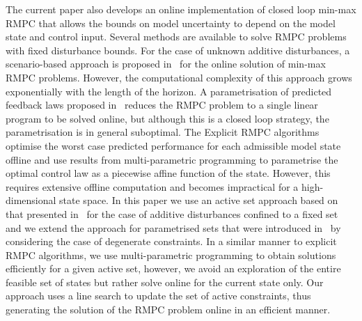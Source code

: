 \documentclass[journal]{IEEEtran}
\theoremstyle{remark}
\theoremstyle{definition}
\begin{document}
The current paper also develops an online implementation of closed loop min-max RMPC that allows the bounds on model uncertainty to depend on the model state and control input.
%
Several methods are available to solve RMPC problems with fixed disturbance bounds. For the case of unknown additive disturbances, 
a scenario-based approach is proposed in~\cite{Scokaert:1998} for the online solution of min-max RMPC problems. However, the computational complexity of this approach grows exponentially with the length of the horizon. 
%
A parametrisation of predicted feedback laws proposed in~\cite{Rakovic:2012} reduces the RMPC problem to a single linear 
program to be solved online, but although this is a closed loop strategy, the parametrisation is in general 
suboptimal. 
%
The Explicit RMPC algorithms~\cite{Bemporad:2003,Diehl:2004} optimise the worst case predicted performance for each admissible model state offline and
use results from multi-parametric programming to parametrise the optimal control law as a piecewise affine function of the
state.
%
However, this requires extensive offline computation and becomes impractical for a high-dimensional state space.
%
In this paper we use an active set approach based on that presented in~\cite{Buerger:ACC,Buerger:IJRNC} for the case of additive disturbances confined to a fixed set and we extend the approach for parametrised sets that were introduced in~\cite{Schaich:NMPC:2015} by considering the case of degenerate constraints.
%
In a similar manner to explicit RMPC algorithms, we use multi-parametric programming to obtain solutions efficiently
for a given active set, however, we avoid an exploration of the entire feasible set of states but rather solve online for the current state only.
%
Our approach uses a line search to update the set of active constraints, thus generating
the solution of the RMPC problem online in an efficient manner.
\end{document}
